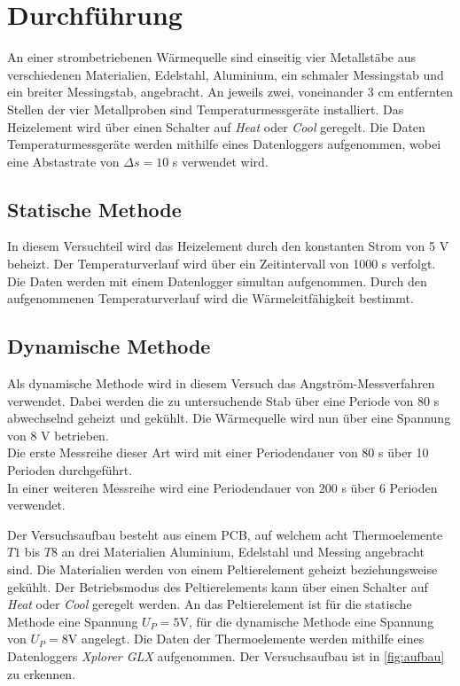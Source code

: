\section{Durchführung}
\label{sec:Durchführung}
An einer strombetriebenen Wärmequelle sind einseitig vier Metallstäbe aus verschiedenen 
Materialien, Edelstahl, Aluminium, ein schmaler Messingstab und ein breiter Messingstab, 
angebracht. An jeweils zwei, voneinander 3 cm entfernten Stellen der vier Metallproben sind 
Temperaturmessgeräte installiert. Das Heizelement wird über einen Schalter auf \textit{Heat}
oder \textit{Cool} geregelt. Die Daten Temperaturmessgeräte werden
mithilfe eines Datenloggers aufgenommen, wobei eine Abstastrate von $\Delta s= 10$ s verwendet wird.


\subsection{Statische Methode}
    In diesem Versuchteil wird das Heizelement
    durch den konstanten Strom von 5 V beheizt. Der Temperaturverlauf
    wird über ein Zeitintervall von 1000 s 
    verfolgt. Die Daten werden mit einem Datenlogger simultan aufgenommen. 
    Durch den aufgenommenen Temperaturverlauf wird die Wärmeleitfähigkeit bestimmt.

\subsection{Dynamische Methode}
    Als dynamische Methode wird in diesem Versuch das Angström-Messverfahren verwendet. Dabei werden
    die zu untersuchende Stab über eine Periode von 80 s abwechselnd geheizt und gekühlt.
    Die Wärmequelle wird nun über eine Spannung von 8 V betrieben.\\
    Die erste Messreihe dieser Art wird mit einer Periodendauer von 80 s über 
    10 Perioden durchgeführt.\\
    In einer weiteren Messreihe wird eine Periodendauer von 200 s über 6 Perioden verwendet.


    \label{sec:aufbau}
    Der Versuchsaufbau besteht aus einem PCB, auf welchem acht Thermoelemente $T1$ bis
    $T8$ an drei Materialien Aluminium, Edelstahl und Messing angebracht sind. Die
    Materialien werden von einem Peltierelement geheizt beziehungsweise gekühlt.
    Der Betriebsmodus des Peltierelements kann über einen Schalter auf \textit{Heat}
    oder \textit{Cool} geregelt werden. An das Peltierelement ist für die statische
    Methode eine Spannung $U_P = 5 \si{\volt}$, für die dynamische Methode eine
    Spannung von $U_P = 8 \si{\volt}$ angelegt. Die Daten der Thermoelemente werden
    mithilfe eines Datenloggers \textit{Xplorer GLX} aufgenommen.
    Der Versuchsaufbau ist in \ref{fig:aufbau} zu erkennen.
    
